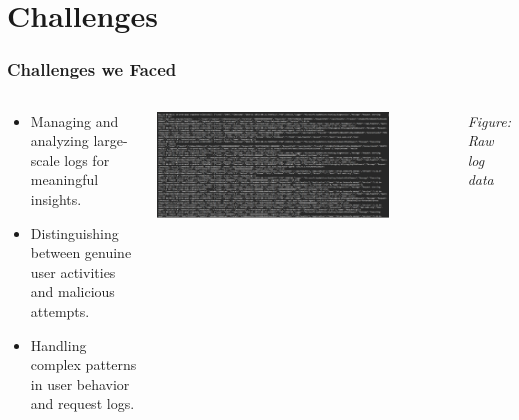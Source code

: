 \documentclass[10pt, a4paper]{beamer}
\begin{document}
	\section{Challenges}
	\begin{frame}
		\frametitle{Challenges we Faced}
		
		\begin{columns}[T,onlytextwidth]
			
			\begin{block}{}
				\begin{itemize}
					\item Managing and analyzing large-scale logs for meaningful insights.
					\item Distinguishing between genuine user activities and malicious attempts.
					\item Handling complex patterns in user behavior and request logs.
				\end{itemize}
			\end{block}
			
			\vfill
			
			\centering
			\includegraphics[width=0.8\textwidth]{images/LogSS.png} %
			
			\vskip 0.1cm %
			\centering
			\textit{Figure: Raw log data} %
			
		\end{columns}
		
	\end{frame}
	
	
	
\end{document}
